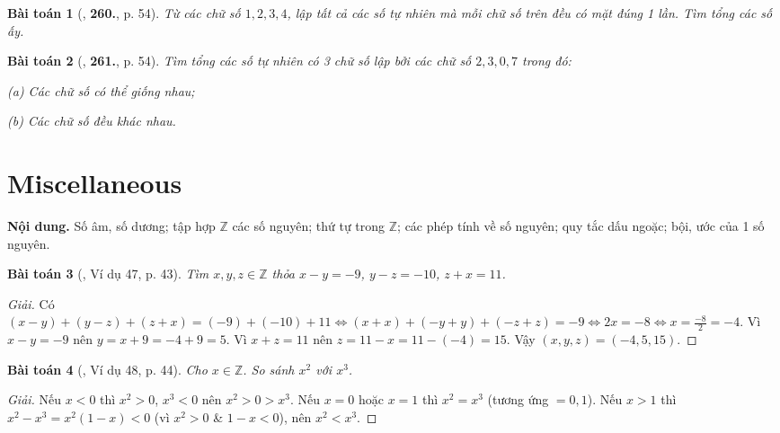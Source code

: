 \documentclass{article}
\numberwithin{equation}{section}
\newtheorem{baitoan}{Bài toán}
\begin{document}
\begin{baitoan}[\cite{Binh_Toan_6_tap_1}, \textbf{260.}, p. 54]
	Từ các chữ số $1,2,3,4$, lập tất cả các số tự nhiên mà mỗi chữ số trên đều có mặt đúng 1 lần. Tìm tổng các số ấy.
\end{baitoan}

\begin{baitoan}[\cite{Binh_Toan_6_tap_1}, \textbf{261.}, p. 54]
	Tìm tổng các số tự nhiên có 3 chữ số lập bởi các chữ số $2,3,0,7$ trong đó:
	\begin{enumerate*}
		\item[(a)] Các chữ số có thể giống nhau;
		\item[(b)] Các chữ số đều khác nhau.
	\end{enumerate*}
\end{baitoan}


\section{Miscellaneous}
\textsf{\textbf{Nội dung.} Số âm, số dương; tập hợp $\mathbb{Z}$ các số nguyên; thứ tự trong $\mathbb{Z}$; các phép tính về số nguyên; quy tắc dấu ngoặc; bội, ước của 1 số nguyên.}

\begin{baitoan}[\cite{Tuyen_Toan_6}, Ví dụ 47, p. 43]
	Tìm $x,y,z\in\mathbb{Z}$ thỏa $x - y = -9$, $y - z = -10$, $z + x = 11$.
\end{baitoan}

\begin{proof}[Giải]
	Có $(x - y) + (y - z) + (z + x) = (-9) + (-10) + 11\Leftrightarrow(x + x) + (-y + y) + (-z + z) = -9\Leftrightarrow2x = -8\Leftrightarrow x = \frac{-8}{2} = -4$. Vì $x - y = -9$ nên $y = x + 9 = -4 + 9 = 5$. Vì $x + z = 11$ nên $z = 11 - x = 11 -(-4) = 15$. Vậy $(x,y,z) = (-4,5,15)$.
\end{proof}

\begin{baitoan}[\cite{Tuyen_Toan_6}, Ví dụ 48, p. 44]
	Cho $x\in\mathbb{Z}$. So sánh $x^2$ với $x^3$.
\end{baitoan}

\begin{proof}[Giải]
	Nếu $x < 0$ thì $x^2 > 0$, $x^3 < 0$ nên $x^2 > 0 > x^3$. Nếu $x = 0$ hoặc $x = 1$ thì $x^2 = x^3$ (tương ứng $=0,1$). Nếu $x > 1$ thì $x^2 - x^3 = x^2(1 - x) < 0$ (vì $x^2 > 0$ \& $1 - x < 0$), nên $x^2 < x^3$.
\end{proof}
\end{document}
